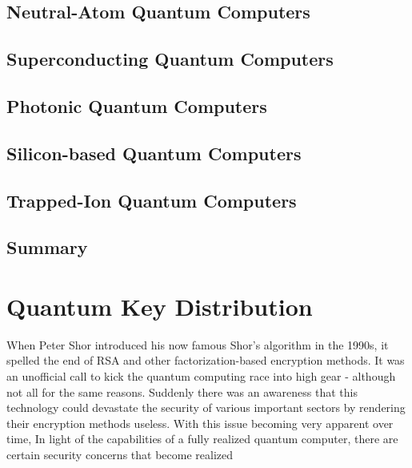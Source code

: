 \documentclass[a4paper, 12pt, twoside]{report}
\begin{document}
\section{Neutral-Atom Quantum Computers}

\section{Superconducting Quantum Computers}

\section{Photonic Quantum Computers}

\section{Silicon-based Quantum Computers}

\section{Trapped-Ion Quantum Computers}

\section{Summary}


\chapter{Quantum Key Distribution}
When Peter Shor introduced his now famous Shor's algorithm in the 1990s, it spelled the end of RSA and other factorization-based encryption methods. It was an unofficial call to kick the quantum computing race into high gear - although not all for the same reasons. Suddenly there was an awareness that this technology could devastate the security of various important sectors by rendering their encryption methods useless. With this issue becoming very apparent over time, 
In light of the capabilities of a fully realized quantum computer, there are certain security concerns that become realized
\end{document}
